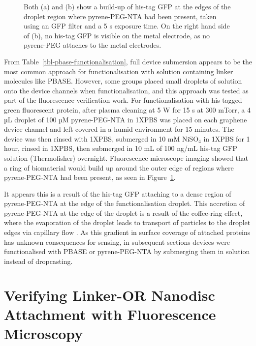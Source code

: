 \documentclass[
  a4paper,
]{scrbook}
\begin{document}
\begin{figure}
\begin{minipage}[t]{0.47\linewidth}
{{}

}

\subcaption{\label{fig-GFP-coffee-ring-2}}
\end{minipage}%

\caption{\label{fig-GFP-coffee-ring}Both (a) and (b) show a build-up of
his-tag GFP at the edges of the droplet region where pyrene-PEG-NTA had
been present, taken using an GFP filter and a 5 s exposure time. On the
right hand side of (b), no his-tag GFP is visible on the metal
electrode, as no pyrene-PEG attaches to the metal electrodes.}

\end{figure}

From Table~\ref{tbl-pbase-functionalisation}, full device submersion
appears to be the most common approach for functionalisation with
solution containing linker molecules like PBASE. However, some groups
placed small droplets of solution onto the device channels when
functionalisation, and this approach was tested as part of the
fluorescence verification work. For functionalisation with his-tagged
green fluorescent protein, after plasma cleaning at 5 W for 15 s at 300
mTorr, a 4 µL droplet of 100 µM pyrene-PEG-NTA in 1XPBS was placed on
each graphene device channel and left covered in a humid environment for
15 minutes. The device was then rinsed with 1XPBS, submerged in 10 mM
NiSO\(_4\) in 1XPBS for 1 hour, rinsed in 1XPBS, then submerged in 10 mL
of 100 ng/mL his-tag GFP solution (Thermofisher) overnight. Fluorescence
microscope imaging showed that a ring of biomaterial would build up
around the outer edge of regions where pyrene-PEG-NTA had been present,
as seen in Figure~\ref{fig-GFP-coffee-ring}.

It appears this is a result of the his-tag GFP attaching to a dense
region of pyrene-PEG-NTA at the edge of the functionalisation droplet.
This accretion of pyrene-PEG-NTA at the edge of the droplet is a result
of the coffee-ring effect, where the evaporation of the droplet leads to
transport of particles to the droplet edges via capillary flow
\autocite{Deegan1997,Shimobayashi2018}. As this gradient in surface
coverage of attached proteins has unknown consequences for sensing, in
subsequent sections devices were functionalised with PBASE or
pyrene-PEG-NTA by submerging them in solution instead of dropcasting.

\hypertarget{sec-linker-receptor-attachment}{%
\section{Verifying Linker-OR Nanodisc Attachment with Fluorescence
Microscopy}\label{sec-linker-receptor-attachment}}
\end{document}
